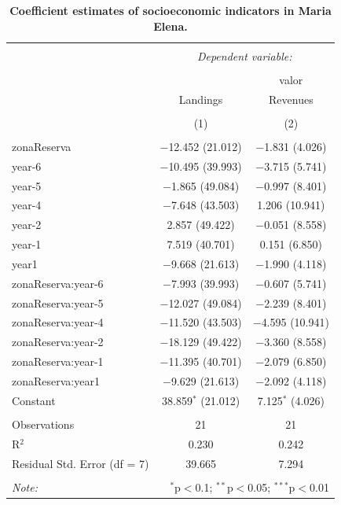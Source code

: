 \documentclass[10pt]{article}
\begin{document}
\begin{table}[!htbp] \centering 
  \caption{{\bf Coefficient estimates of socioeconomic indicators in Maria Elena.}} 
  \label{} 
\small 
\begin{tabular}{@{\extracolsep{1pt}}lcc} 
\\[-1.8ex]\hline 
\hline \\[-1.8ex] 
 & \multicolumn{2}{c}{\textit{Dependent variable:}} \\ 
\cline{2-3} 
\\[-1.8ex] &  & valor \\ 
 & Landings & Revenues \\ 
\\[-1.8ex] & (1) & (2)\\ 
\hline \\[-1.8ex] 
 zonaReserva & $-$12.452 (21.012) & $-$1.831 (4.026) \\ 
  year-6 & $-$10.495 (39.993) & $-$3.715 (5.741) \\ 
  year-5 & $-$1.865 (49.084) & $-$0.997 (8.401) \\ 
  year-4 & $-$7.648 (43.503) & 1.206 (10.941) \\ 
  year-2 & 2.857 (49.422) & $-$0.051 (8.558) \\ 
  year-1 & 7.519 (40.701) & 0.151 (6.850) \\ 
  year1 & $-$9.668 (21.613) & $-$1.990 (4.118) \\ 
  zonaReserva:year-6 & $-$7.993 (39.993) & $-$0.607 (5.741) \\ 
  zonaReserva:year-5 & $-$12.027 (49.084) & $-$2.239 (8.401) \\ 
  zonaReserva:year-4 & $-$11.520 (43.503) & $-$4.595 (10.941) \\ 
  zonaReserva:year-2 & $-$18.129 (49.422) & $-$3.360 (8.558) \\ 
  zonaReserva:year-1 & $-$11.395 (40.701) & $-$2.079 (6.850) \\ 
  zonaReserva:year1 & $-$9.629 (21.613) & $-$2.092 (4.118) \\ 
  Constant & 38.859$^{*}$ (21.012) & 7.125$^{*}$ (4.026) \\ 
 \hline \\[-1.8ex] 
Observations & 21 & 21 \\ 
R$^{2}$ & 0.230 & 0.242 \\ 
Residual Std. Error (df = 7) & 39.665 & 7.294 \\ 
\hline 
\hline \\[-1.8ex] 
\textit{Note:}  & \multicolumn{2}{r}{$^{*}$p$<$0.1; $^{**}$p$<$0.05; $^{***}$p$<$0.01} \\ 
\end{tabular} 
\end{table} 
\end{document}
